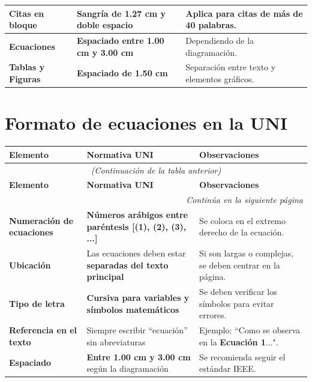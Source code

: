 \documentclass{report}
\newcommand{\greencheck}{{\color{green}\ding{51}}} %
\begin{document}
\begin{longtable}{|l|p{7cm}|p{8cm}|}
    \textbf{Citas en bloque} & \textbf{Sangría de 1.27 cm y doble espacio} & Aplica para citas de más de 40 palabras. \\ \hline

    \textbf{Ecuaciones} & \textbf{Espaciado entre 1.00 cm y 3.00 cm} & Dependiendo de la diagramación. \\ \hline

    \textbf{Tablas y Figuras} & \textbf{Espaciado de 1.50 cm} & Separación entre texto y elementos gráficos. \\ \hline

\end{longtable}

\section*{\color{red} Formato de ecuaciones en la UNI \greencheck}

\begin{longtable}{|p{5cm}|p{5cm}|p{8cm}|}
    \hline
    \textbf{Elemento} & \textbf{Normativa UNI} & \textbf{Observaciones} \\ \hline
    \endfirsthead

    \multicolumn{3}{c}{{\textit{(Continuación de la tabla anterior)}}} \\ \hline
    \textbf{Elemento} & \textbf{Normativa UNI} & \textbf{Observaciones} \\ \hline
    \endhead

    \hline \multicolumn{3}{|r|}{{\textit{Continúa en la siguiente página}}} \\ \hline
    \endfoot

    \hline
    \endlastfoot

    \textbf{Numeración de ecuaciones} & \textbf{Números arábigos entre paréntesis [(1), (2), (3), ...]} & Se coloca en el extremo derecho de la ecuación. \\ \hline

    \textbf{Ubicación} & Las ecuaciones deben estar \textbf{separadas del texto principal} & Si son largas o complejas, se deben centrar en la página. \\ \hline

    \textbf{Tipo de letra} & \textbf{Cursiva para variables y símbolos matemáticos} & Se deben verificar los símbolos para evitar errores. \\ \hline

    \textbf{Referencia en el texto} & Siempre escribir “ecuación” sin abreviaturas & Ejemplo: “Como se observa en la \textbf{Ecuación 1}...". \\ \hline

    \textbf{Espaciado} & \textbf{Entre 1.00 cm y 3.00 cm} según la diagramación & Se recomienda seguir el estándar IEEE. \\ \hline

\end{longtable}
\end{document}
